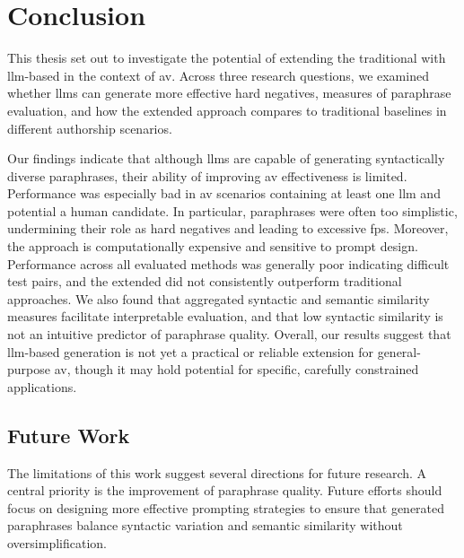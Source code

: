 \chapter{Conclusion}
\label{chap:conclusion}

This thesis set out to investigate the potential of extending the traditional \impAppr{} with \ac{llm}-based \imps{} in the context of \ac{av}. 
Across three research questions, we examined whether \acp{llm} can generate more effective hard negatives, measures of paraphrase evaluation, and how the extended approach compares to traditional baselines in different authorship scenarios. 

Our findings indicate that although \acp{llm} are capable of generating syntactically diverse paraphrases, their ability of improving \ac{av} effectiveness is limited. 
Performance was especially bad in \ac{av} scenarios containing at least one \ac{llm} and potential a human candidate.
In particular, paraphrases were often too simplistic, undermining their role as hard negatives and leading to excessive \acp{fp}. 
Moreover, the approach is computationally expensive and sensitive to prompt design. 
Performance across all evaluated methods was generally poor indicating difficult test pairs, and the extended \impAppr{} did not consistently outperform traditional approaches. 
We also found that aggregated syntactic and semantic similarity measures facilitate interpretable evaluation, and that low syntactic similarity is not an intuitive predictor of paraphrase quality. 
Overall, our results suggest that \ac{llm}-based \imp{} generation is not yet a practical or reliable extension for general-purpose \ac{av}, though it may hold potential for specific, carefully constrained applications.


\section{Future Work}

The limitations of this work suggest several directions for future research. 
A central priority is the improvement of paraphrase quality. 
Future efforts should focus on designing more effective prompting strategies to ensure that generated paraphrases balance syntactic variation and semantic similarity without oversimplification. 

